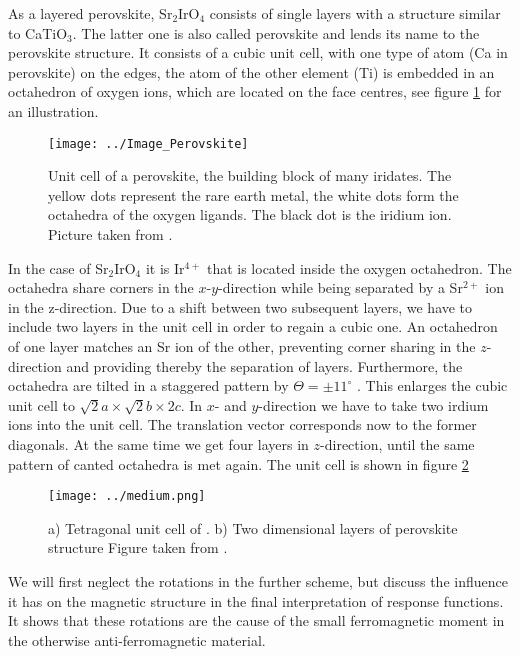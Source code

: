 As a layered perovskite, Sr$_2$IrO$_4$ consists of single layers with a structure similar to CaTiO$_3$.
The latter one is also called perovskite and lends its name to the perovskite structure.
It consists of a cubic unit cell, with one type of atom (Ca in perovskite) on the edges, 
the  atom of the other element (Ti) is embedded in an octahedron of 
oxygen ions, which are located on the face centres, see figure \ref{perovskite} for an illustration.
%
\begin{figure}[!htbp]
 \centering
 \texttt{[image: ../Image\_Perovskite]}
 \caption{Unit cell of a perovskite, the building block of many iridates. The yellow dots represent the rare earth metal, the white dots form the octahedra of the oxygen ligands. The black dot is the iridium ion.
	  Picture taken from \cite{Perovskitebilde}.}
	  \label{perovskite}
\end{figure}
%
In the case of Sr$_2$IrO$_4$ it is Ir$^{4+}$ that is located  inside the oxygen octahedron. 
The octahedra share corners in the $x$-$y$-direction while being separated by a Sr$^{2+}$ ion in the z-direction.
Due to a shift between two subsequent layers, we have to include two layers in the unit cell in order to regain a cubic one.
An octahedron of one layer matches an Sr ion of the other, preventing  corner sharing in the $z$-direction and providing thereby the separation of layers. 
% 
Furthermore, the octahedra are tilted in a staggered pattern by $\Theta = \pm 11^{\circ}$ \cite{PhysRevB.49.9198}.
This enlarges the cubic unit cell to $\sqrt2 a\times\sqrt 2b \times 2c$.
In $x$- and $y$-direction we have to take two irdium ions into the unit cell. The translation vector corresponds now to the former diagonals.
At the same time we get four layers in $z$-direction, until the same pattern of canted octahedra is met again. The unit cell is shown in figure \ref{unitcell}
%
\begin{figure}
\centering
\texttt{[image: ../medium.png]}
\caption{a) Tetragonal unit cell of \Sriro. \quad b) Two dimensional layers of perovskite structure \newline Figure taken from \cite{PhysRevLett.108.177003}.}
\label{unitcell}
\end{figure}
%
We will first neglect the rotations in the further scheme, but discuss the influence it has on the magnetic structure in the final interpretation of 
response functions. It shows that these rotations are the cause of the small ferromagnetic moment in the otherwise anti-ferromagnetic material. 

